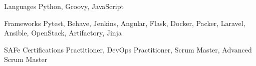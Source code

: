 
\begin{cvskills}
  \cvskill
    {Languages} %
    {Python, Groovy, JavaScript} %

  \cvskill
    {Frameworks} %
    {
        Pytest,
        Behave,
        Jenkins,
        Angular,
        Flask,
        Docker,
        Packer,
        Laravel,
        Ansible,
        OpenStack,
        Artifactory,
        Jinja
    } %

  \cvskill
    {SAFe Certifications}
    {Practitioner, DevOps Practitioner, Scrum Master, Advanced Scrum Master}

\end{cvskills}

